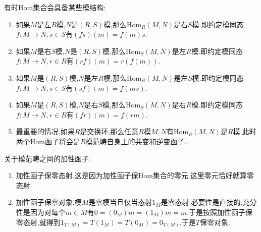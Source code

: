有时Hom集合会具备某些模结构:
\begin{enumerate}
	\item 如果$M$是左$R$模,$N$是$(R,S)$模,那么$\mathrm{Hom}_R(M,N)$是右$S$模.即约定模同态$f:M\to N,s\in S$有$(fs)(m)=f(m)s$.
	\item 如果$M$是右$S$模,$N$是$(R,S)$模,那么$\mathrm{Hom}_S(M,N)$是左$R$模.即约定模同态$f:M\to N,r\in R$有$(rf)(m)=r(f(m))$.
	\item 如果$M$是$(R,S)$模,$N$是左$R$模,那么$\mathrm{Hom}_R(M,N)$是左$S$模.即约定模同态$f:M\to N,s\in S$有$(sf)(m)=f(ms)$.
	\item 如果$M$是$(R,S)$模,$N$是右$S$模,那么$\mathrm{Hom}_S(M,N)$是右$R$模.即约定模同态$f:M\to N,r\in R$有$(fr)(m)=f(rm)$.
	\item 最重要的情况,如果$R$是交换环,那么任意$R$模$M,N$有$\mathrm{Hom}_R(M,N)$是$R$模.此时两个Hom函子将会是$R$模范畴自身上的共变和逆变函子.
\end{enumerate}

关于模范畴之间的加性函子.
\begin{enumerate}
	\item 加性函子保零态射.这是因为加性函子保Hom集合的零元.这里零元恰好就算零态射.
	\item 加性函子保零对象.模$M$是零模当且仅当态射$1_M$是零态射:必要性是直接的,充分性是因为对每个$m\in M$有$0=(0_M)m=(1_M)m=m$.于是按照加性函子保零态射,就得到$1_{T(M)}=T(1_M)=T(0_M)=0_{T(M)}$,于是$T$保零对象.
\end{enumerate}


